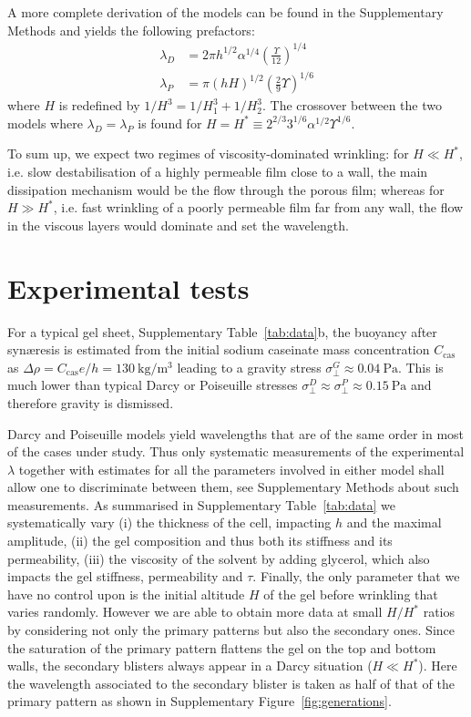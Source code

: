 \documentclass[twocolumn,superscriptaddress,showpacs,preprintnumbers,
amsmath,amssymb,prl]{revtex4-1}
\begin{document}
A more complete derivation of the models can be found in the Supplementary Methods and yields the following prefactors:
\begin{align}
\lambda_D &= 2\pi h^{1/2}\alpha^{1/4}\left(\frac{\Upsilon}{12}\right)^{1/4}\\
\lambda_P &= \pi (hH)^{1/2}\left(\frac{2}{9}\Upsilon\right)^{1/6}
\end{align}
where $H$ is redefined by $1/H^3 = 1/H_1^3 + 1/H_2^3$. The crossover between the two models where $\lambda_D=\lambda_P$ is found for $H = H^* \equiv 2^{2/3} 3^{1/6} \alpha^{1/2} \Upsilon^{1/6}$.

To sum up, we expect two regimes of viscosity-dominated wrinkling: for $H\ll H^*$, i.e. slow destabilisation of a highly permeable film close to a wall, the main dissipation mechanism would be the flow through the porous film; whereas for $H\gg H^*$, i.e. fast wrinkling of a poorly permeable film far from any wall, the flow in the viscous layers would dominate and set the wavelength.

\section*{Experimental tests}

For a typical gel sheet, Supplementary Table~\ref{tab:data}b, the buoyancy after syn\ae{}resis is estimated from the initial sodium caseinate mass concentration $C_\text{cas}$ as $\Delta\rho=C_\text{cas} e/h = \SI{130}{\kilo\gram\per\cubic\metre}$ leading to a gravity stress $\sigma_\perp^G \approx \SI{0.04}{\pascal}$. This is much lower than typical Darcy or Poiseuille stresses $\sigma_\perp^D \approx \sigma_\perp^P \approx \SI{0.15}{\pascal}$ and therefore gravity is dismissed.


Darcy and Poiseuille models yield wavelengths that are of the same order in most of the cases under study. Thus only systematic measurements of the experimental $\lambda$ together with estimates for all the parameters involved in either model shall allow one to discriminate between them, see Supplementary Methods about such measurements. As summarised in Supplementary Table~\ref{tab:data} we systematically vary (i) the thickness of the cell, impacting $h$ and the maximal amplitude, (ii) the gel composition and thus both its stiffness and its permeability, (iii) the viscosity of the solvent by adding glycerol, which also impacts the gel stiffness, permeability and $\tau$. Finally, the only parameter that we have no control upon is the initial altitude $H$ of the gel before wrinkling that varies randomly. However we are able to obtain more data at small $H/H^*$ ratios by considering not only the primary patterns but also the secondary ones. Since the saturation of the primary pattern flattens the gel on the top and bottom walls, the secondary blisters always appear in a Darcy situation ($H\ll H^*$). Here the wavelength associated to the secondary blister is taken as half of that of the primary pattern as shown in Supplementary Figure~\ref{fig:generations}.
\end{document}
